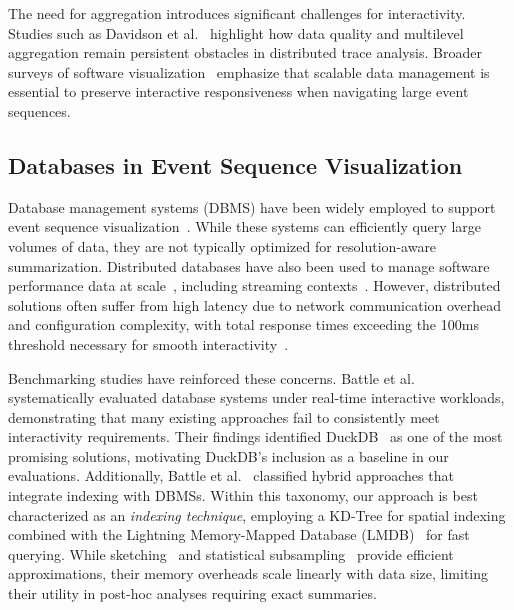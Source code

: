 \begin{refsection}
The need for aggregation introduces significant challenges for interactivity. Studies such as Davidson et al.~\cite{davidson2023qualitative} highlight how data quality and multilevel aggregation remain persistent obstacles in distributed trace analysis. Broader surveys of software visualization~\cite{isaacs2014state, ezzati2017multi} emphasize that scalable data management is essential to preserve interactive responsiveness when navigating large event sequences.

\subsection{Databases in Event Sequence Visualization}
Database management systems (DBMS) have been widely employed to support event sequence visualization~\cite{bell2003paraprof, antweiler2022uncovering, sun2021daisen, battle2016dynamic, agarwal2013blinkdb, heer2023mosaic}. While these systems can efficiently query large volumes of data, they are not typically optimized for resolution-aware summarization. Distributed databases have also been used to manage software performance data at scale~\cite{moritz2015perfopticon, kaldor2017canopy, kruchten2022vegafusion, shen2023qevis}, including streaming contexts~\cite{kesavan2020visual, khan2023web}. However, distributed solutions often suffer from high latency due to network communication overhead and configuration complexity, with total response times exceeding the 100ms threshold necessary for smooth interactivity~\cite{kaldor2017canopy, kruchten2022vegafusion}.

Benchmarking studies have reinforced these concerns. Battle et al.~\cite{battle2020database} systematically evaluated database systems under real-time interactive workloads, demonstrating that many existing approaches fail to consistently meet interactivity requirements. Their findings identified DuckDB~\cite{raasveldt2019duckdb} as one of the most promising solutions, motivating DuckDB's inclusion as a baseline in our evaluations. Additionally, Battle et al.~\cite{battle2020structured} classified hybrid approaches that integrate indexing with DBMSs. Within this taxonomy, our approach is best characterized as an \textit{indexing technique}, employing a KD-Tree for spatial indexing combined with the Lightning Memory-Mapped Database (LMDB)~\cite{lmdb} for fast querying. While sketching~\cite{cormode2017data, budiu2015interacting} and statistical subsampling~\cite{budiu2019hillview, de2010zinsight, drebes2014aftermath} provide efficient approximations, their memory overheads scale linearly with data size, limiting their utility in post-hoc analyses requiring exact summaries.


\end{refsection}
